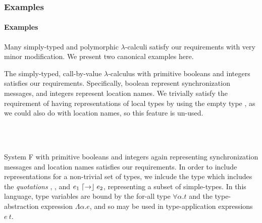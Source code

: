 \iftr\subsubsection{Examples}\else\paragraph{Examples}\fi
\label{sec:loc-lang-examples}
Many simply-typed and polymorphic $\lambda$-calculi satisfy our requirements with very minor modification.
We present two canonical examples here.

\begin{ex}
  \label{ex:st-lambda}
  The simply-typed, call-by-value $\lambda$-calculus with primitive booleans and integers satisfies our requirements.
  Specifically, boolean represent synchronization messages, and integers represent location names.
  We trivially satisfy the requirement of having representations of local types by using the empty type \Empty, as we could also do with location names, so this feature is un-used.
  \begin{syntax}
  	 \alternative{\Int} \alternative{\Bool} \alternative{\Empty} 
       \\
      \\
    \alternative{\True} \alternative{\False} 
  \end{syntax}
\end{ex}

\begin{ex}[System F]
  \label{ex:system-f}
  System F with primitive booleans and integers again representing synchronization messages and location names satisfies our requirements.
  In order to include representations for a non-trivial set of types, we inlcude the type \Typ which includes the \emph{quotations} \say{\Int}, \say{\Bool}, and $e_1 \mathrel{\lceil\mathord{\to}\rfloor} e_2$, representing a subset of simple-types.
  In this language, type variables are bound by the for-all type $\forall \alpha.t$ and the type-abstraction expression $\Lambda \alpha.e$, and so may be used in type-application expressions $e~t$.
  \begin{syntax}
  	 \alternative{\alpha} \alternative{\Int} \alternative{\Bool} \alternative{\Typ}\\
  	 
         \\
      \\
    \alternative{\True} \alternative{\False} \\
    \alternative{\say{\Int}} \alternative{\say{\Bool}} 
  \end{syntax}
\end{ex}

